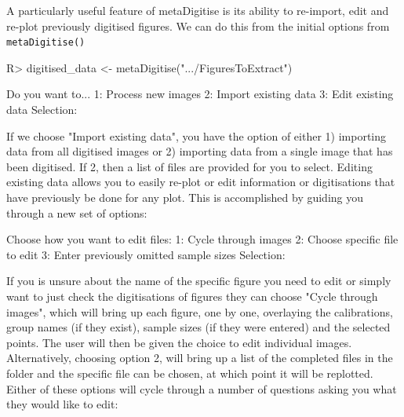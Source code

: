\documentclass[12pt]{article}
\newcommand{\fct}[1]{\texttt{#1()}}
\newcommand{\pkg}[1]{{\fontseries{b}\selectfont #1}}
\begin{document}
A particularly useful feature of \pkg{metaDigitise} is its ability to re-import, edit and re-plot previously digitised figures. We can do this from the initial options from \fct{metaDigitise}


\begin{CodeChunk}
\begin{CodeInput}
R> digitised_data <- metaDigitise(".../FiguresToExtract")
\end{CodeInput}
\begin{CodeOutput}
    Do you want to...
1: Process new images
2: Import existing data
3: Edit existing data
Selection: 
\end{CodeOutput}
\end{CodeChunk}

If we choose "Import existing data", you have the option of either 1) importing data from all digitised images or 2) importing data from a single image that has been digitised. If 2, then a list of files are provided for you to select. Editing existing data allows you to easily re-plot or edit information or digitisations that have previously be done for any plot. This is accomplished by guiding you through a new set of options:

\begin{CodeChunk}
\begin{CodeOutput}
Choose how you want to edit files:
1: Cycle through images
2: Choose specific file to edit
3: Enter previously omitted sample sizes
Selection: 
\end{CodeOutput}
\end{CodeChunk}

If you is unsure about the name of the specific figure you need to edit or simply want to just check the digitisations of figures they can choose "Cycle through images", which will bring up each figure, one by one, overlaying the calibrations, group names (if they exist), sample sizes (if they were entered) and the selected points. The user will then be given the choice to edit individual images. Alternatively, choosing option 2, will bring up a list of the completed files in the folder and the specific file can be chosen, at which point it will be replotted. Either of these options will cycle through a number of questions asking you what they would like to edit:
\end{document}

